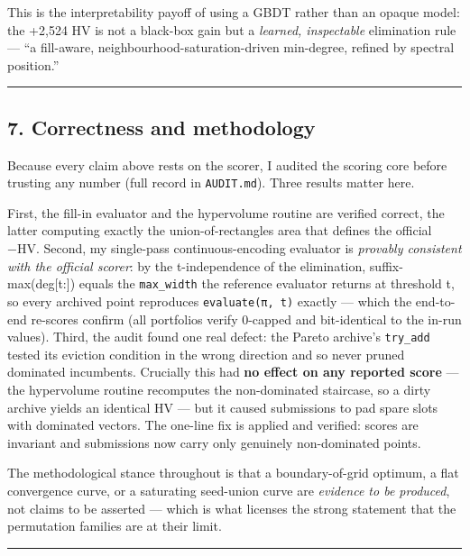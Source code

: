 \documentclass[
  11pt,
]{article}
\begin{document}
This is the interpretability payoff of using a GBDT rather than an
opaque model: the +2,524 HV is not a black-box gain but a \emph{learned,
inspectable} elimination rule --- ``a fill-aware,
neighbourhood-saturation-driven min-degree, refined by spectral
position.''

\begin{center}\rule{0.5\linewidth}{0.5pt}\end{center}

\hypertarget{correctness-and-methodology}{%
\subsection{7. Correctness and
methodology}\label{correctness-and-methodology}}

Because every claim above rests on the scorer, I audited the scoring
core before trusting any number (full record in \texttt{AUDIT.md}).
Three results matter here.

First, the fill-in evaluator and the hypervolume routine are verified
correct, the latter computing exactly the union-of-rectangles area that
defines the official −HV. Second, my single-pass continuous-encoding
evaluator is \emph{provably consistent with the official scorer}: by the
t-independence of the elimination, suffix-max(deg{[}t:{]}) equals the
\texttt{max\_width} the reference evaluator returns at threshold t, so
every archived point reproduces \texttt{evaluate(π,\ t)} exactly ---
which the end-to-end re-scores confirm (all portfolios verify 0-capped
and bit-identical to the in-run values). Third, the audit found one real
defect: the Pareto archive's \texttt{try\_add} tested its eviction
condition in the wrong direction and so never pruned dominated
incumbents. Crucially this had \textbf{no effect on any reported score}
--- the hypervolume routine recomputes the non-dominated staircase, so a
dirty archive yields an identical HV --- but it caused submissions to
pad spare slots with dominated vectors. The one-line fix is applied and
verified: scores are invariant and submissions now carry only genuinely
non-dominated points.

The methodological stance throughout is that a boundary-of-grid optimum,
a flat convergence curve, or a saturating seed-union curve are
\emph{evidence to be produced}, not claims to be asserted --- which is
what licenses the strong statement that the permutation families are at
their limit.

\begin{center}\rule{0.5\linewidth}{0.5pt}\end{center}
\end{document}
